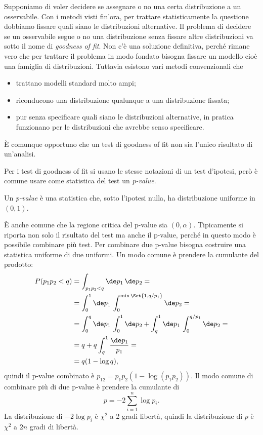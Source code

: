 
Supponiamo di voler decidere se assegnare o no una certa distribuzione a un osservabile.
Con i metodi visti fin'ora,
per trattare statisticamente la questione dobbiamo fissare quali siano le distribuzioni alternative.
Il problema di decidere se un osservabile segue o no una distribuzione
senza fissare altre distribuzioni va sotto il nome di \emph{goodness of fit}.
Non c'è una soluzione definitiva,
perché rimane vero che per trattare il problema in modo fondato
bisogna fissare un modello cioè una famiglia di distribuzioni.
Tuttavia esistono vari metodi convenzionali che
\begin{itemize}
	\item trattano modelli standard molto ampi;
	\item riconducono una distribuzione qualunque a una distribuzione fissata;
	\item pur senza specificare quali siano le distribuzioni alternative,
	in pratica funzionano per le distribuzioni che avrebbe senso specificare.
\end{itemize}
È comunque opportuno che un test di goodness of fit
non sia l'unico risultato di un'analisi.

Per i test di goodness of fit si usano le stesse notazioni di un test d'ipotesi,
però è comune usare come statistica del test un \emph{p-value}.

\begin{definition}[p-value]
	Un \emph{p-value} è una statistica che,
	sotto l'ipotesi nulla,
	ha distribuzione uniforme in $(0,1)$.
\end{definition}

\noindent È anche comune che la regione critica del p-value sia $(0,\alpha)$.
Tipicamente si riporta non solo il risultato del test ma anche il p-value,
perché in questo modo è possibile combinare più test.
Per combinare due p-value bisogna costruire una statistica uniforme di due uniformi.
Un modo comune è prendere la cumulante del prodotto:
\begin{align*}
	P(p_1p_2<q)
	&= \int_{p_1p_2<q}\de p_1\,\de p_2 = \\
	&= \int_0^1\de p_1\, \int_0^{\min\Set{1,q/p_1}} \de p_2 = \\
	&= \int_0^q\de p_1\, \int_0^1 \de p_2
	+ \int_q^1 \de p_1\, \int_0^{q/p_1} \de p_2 = \\
	&= q + q\int_q^1 \frac{\de p_1}{p_1} = \\
	&= q(1-\log q),
\end{align*}
quindi il p-value combinato è $p_{12} = p_1p_2(1-\log(p_1p_2))$.
Il modo comune di combinare più di due p-value è prendere la cumulante di
\begin{equation*}
	p = -2 \sum_{i=1}^n \log p_i.
\end{equation*}
La distribuzione di $-2\log p_i$ è $\chi^2$ a 2 gradi libertà,
quindi la distribuzione di $p$ è $\chi^2$ a $2n$ gradi di libertà.

